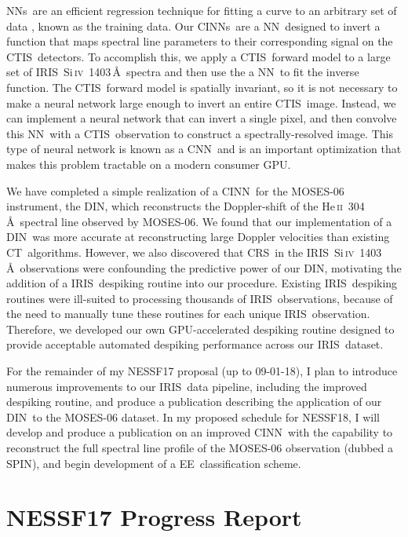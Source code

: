\documentclass[10pt,letterpaper]{article}
\newcommand{\SiIV}{Si\,\textsc{iv}~1403\,\AA}
\newcommand{\HeII}{He\,\textsc{ii}~304\,\AA}
\newcommand{\EE}{\ac{EE}}
\newcommand{\CT}{\ac{CT}}
\newcommand{\CTIS}{\ac{CTIS}}
\newcommand{\MOSES}{\ac{MOSES}}
\newcommand{\NN}{\ac{NN}}
\newcommand{\NNs}{\acp{NN}}
\newcommand{\CNN}{\ac{CNN}}
\newcommand{\CINN}{\ac{CINN}}
\newcommand{\CINNs}{\acp{CINN}}
\newcommand{\DIN}{\ac{DIN}}
\newcommand{\SPIN}{\ac{SPIN}}
\newcommand{\IRIS}{\ac{IRIS}}
\newcommand{\CRS}{\ac{CRS}}
\newcommand{\GPU}{\ac{GPU}}
\begin{document}
		\NNs\ are an efficient regression technique for fitting a curve to an arbitrary set of data \citep{ai}, known as the training data.
		Our \CINNs\ are a \NN\ designed to invert a function that maps spectral line parameters to their corresponding signal on the \CTIS\ detectors.
		To accomplish this, we apply a \CTIS\ forward model to a large set of \IRIS\ \SiIV\ spectra and then use the a \NN\ to fit the inverse function.
		The \CTIS\ forward model is spatially invariant, so it is not necessary to make a neural network large enough to invert an entire \CTIS\ image.
		Instead, we can implement a neural network that can invert a single pixel, and then convolve this \NN\ with a \CTIS\ observation to construct a spectrally-resolved image.
		This type of neural network is known as a \CNN\ and is an important optimization that makes this problem tractable on a modern consumer \GPU.
			
		We have completed a simple realization of a \CINN\ for the \MOSES-06 instrument, the \DIN, which reconstructs the Doppler-shift of the \HeII\ spectral line observed by \MOSES-06.
		We found that our implementation of a \DIN\ was more accurate at reconstructing large Doppler velocities than existing \CT\ algorithms.
		However, we also discovered that \CRS\ in the \IRIS\ \SiIV\ observations were confounding the predictive power of our \DIN, motivating the addition of a \IRIS\ despiking routine into our procedure.
		Existing \IRIS\ despiking routines were ill-suited to processing thousands of \IRIS\ observations, because of the need to manually tune these routines for each unique \IRIS\ observation.
		Therefore, we developed our own GPU-accelerated despiking routine designed to provide acceptable automated despiking performance across our \IRIS\ dataset.
		
		For the remainder of my NESSF17 proposal (up to 09-01-18), I plan to introduce numerous improvements to our \IRIS\ data pipeline, including the improved despiking routine, and produce a publication describing the application of our \DIN\ to the \MOSES-06 dataset.
		In my proposed schedule for NESSF18, I will develop and produce a publication on an improved \CINN\ with the capability to reconstruct the full spectral line profile of the \MOSES-06 observation (dubbed a \SPIN), and begin development of a \EE\ classification scheme.
		
		
	
	\section{NESSF17 Progress Report} 
	
\end{document}
